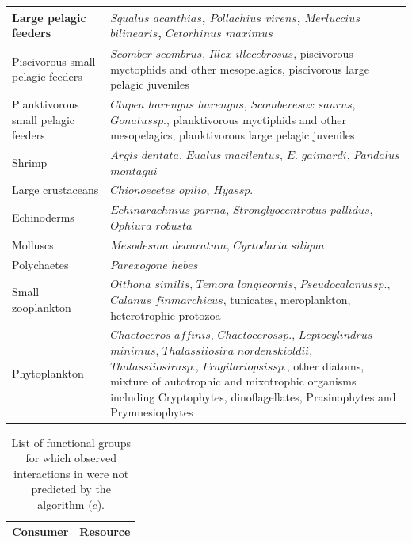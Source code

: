 \begin{singlespace}
\begin{longtable}{ p{} p{} }
        \hline
        Large pelagic feeders              & $Squalus$ $acanthias$, $Pollachius$ $virens$, $Merluccius$ $bilinearis$, $Cetorhinus$ $maximus$    \\
        \hline
        Piscivorous small pelagic feeders  & $Scomber$ $scombrus$, $Illex$ $illecebrosus$, piscivorous myctophids and other mesopelagics, piscivorous large pelagic juveniles   \\
        \hline
        Planktivorous small pelagic feeders& $Clupea$ $harengus$ $harengus$, $Scomberesox$ $saurus$, $Gonatus sp.$, planktivorous myctiphids and other mesopelagics, planktivorous large pelagic juveniles  \\
        \hline
        Shrimp                             & $Argis$ $dentata$, $Eualus$ $macilentus$, $E.$ $gaimardi$, $Pandalus$ $montagui$   \\
        \hline
        Large crustaceans                  & $Chionoecetes$ $opilio$, $Hyas sp.$    \\
        \hline
        Echinoderms                        & $Echinarachnius$ $parma$, $Stronglyocentrotus$ $pallidus$, $Ophiura$ $robusta$ \\
        \hline
        Molluscs                           & $Mesodesma$ $deauratum$, $Cyrtodaria$ $siliqua$    \\
        \hline
        Polychaetes                         & $Parexogone$ $hebes$   \\
        \hline
        Small zooplankton                  & $Oithona$ $similis$, $Temora$ $longicornis$, $Pseudocalanus sp.$, $Calanus$ $finmarchicus$, tunicates, meroplankton, heterotrophic protozoa    \\
        \hline
        Phytoplankton                      & $Chaetoceros$ $affinis$, $Chaetoceros sp.$, $Leptocylindrus$ $minimus$, $Thalassiiosira$ $nordenskioldii$, $Thalassiiosira sp.$, $Fragilariopsis sp.$, other diatoms, mixture of autotrophic and mixotrophic organisms including Cryptophytes, dinoflagellates, Prasinophytes and Prymnesiophytes  \\
    \bottomrule
  \end{longtable}

  \begin{longtable}{ p{} p{} }
  \caption{List of functional groups for which observed interactions in \citet{savenkoff2004} were not predicted by the algorithm ($c$).}
  \label{ch2-tbl2}
  \tabularnewline
    \toprule
      Consumer               & Resource \\
    \hline  \hline
    \endfirsthead


\end{longtable}
\end{singlespace}
